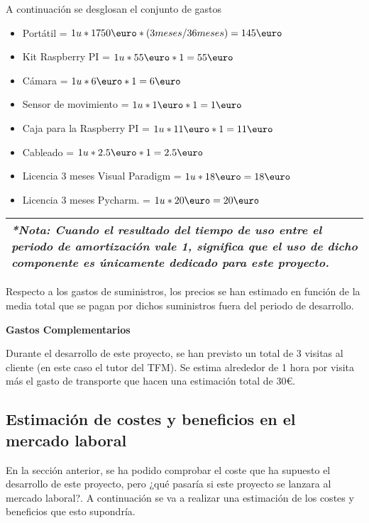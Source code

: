 A continuación se desglosan el conjunto de gastos

\begin{itemize}
\item Portátil = $ 1u* 1750\text{\euro} * (3 meses/36 meses) = 145\text{\euro} $
\item Kit Raspberry PI = $ 1u*55\text{\euro} * 1 = 55\text{\euro} $
\item Cámara = $ 1u* 6\text{\euro} * 1 = 6\text{\euro} $
\item Sensor de movimiento = $ 1u* 1\text{\euro} * 1 = 1\text{\euro} $
\item Caja para la Raspberry PI = $ 1u* 11\text{\euro} * 1 = 11\text{\euro} $
\item Cableado = $ 1u* 2.5\text{\euro} * 1 = 2.5\text{\euro} $
\item Licencia 3 meses Visual Paradigm = $ 1u* 18\text{\euro} = 18\text{\euro} $
\item Licencia 3 meses Pycharm. = $ 1u* 20\text{\euro} = 20\text{\euro} $
\end{itemize}

\begin{tabular}{|p{15.5cm}|}
	
	\hline
	
	\textit{ \textbf{*Nota:} Cuando el resultado del tiempo de uso entre el periodo de amortización vale 1, significa que el uso de dicho componente es únicamente dedicado para este proyecto.}
	\\
	\hline
	
\end{tabular}

\vspace{0.3cm}

Respecto a los gastos de suministros, los precios se han estimado en función de la media total que se pagan por dichos suministros fuera del periodo de desarrollo.

\textbf{Gastos Complementarios}

Durante el desarrollo de este proyecto, se han previsto un total de 3 visitas al cliente (en este caso el tutor del TFM). Se estima alrededor de 1 hora por visita más el gasto de transporte que hacen una estimación total de 30\euro.

\subsection{Estimación de costes y beneficios en el mercado laboral}

En la sección anterior, se ha podido comprobar el coste que ha supuesto el desarrollo de este proyecto, pero ¿qué pasaría si este proyecto se lanzara al mercado laboral?. A continuación se va a realizar una estimación de los costes y beneficios que esto supondría.

